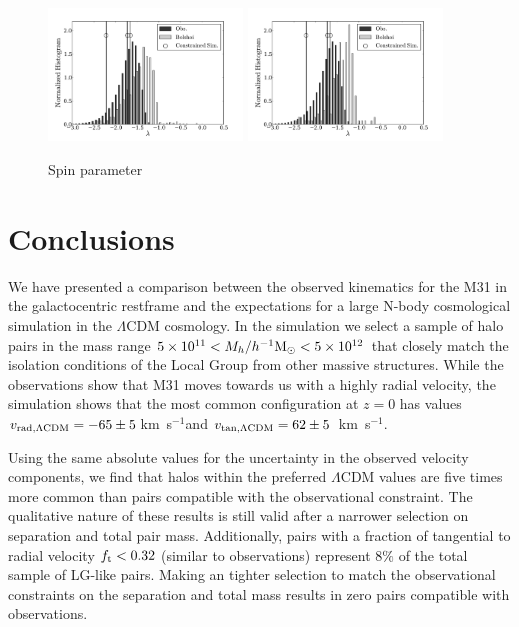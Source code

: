 \documentclass{emulateapj}
\newcommand{\kms}{\,km~s$^{-1}$}
\newcommand{\hMsun}{{\ifmmode{h^{-1}{\rm {M_{\odot}}}}\else{$h^{-1}{\rm{M_{\odot}}}$}\fi}}
\begin{document}
\begin{figure}
\begin{center}
\includegraphics[keepaspectratio=true,width=0.46\textwidth]{./figures/test_lambda.pdf}
\includegraphics[keepaspectratio=true,width=0.46\textwidth]{./figures/test_lambda_narrow.pdf}
\caption{Spin parameter}
\label{fig:lambda}
\end{center}
\end{figure}


\section{Conclusions}
We have presented a comparison between the observed kinematics for the M31 in the galactocentric restframe and the expectations for a large N-body cosmological simulation in the $\Lambda$CDM cosmology. In the simulation we select a sample of halo pairs in the mass range $5\times 10^{11}<M_{h}/\hMsun<5\times 10^{12}$ that closely match the isolation conditions of the Local Group from other massive structures. While the observations show that M31 moves towards us with a highly radial velocity, the simulation shows that the most common configuration at $z=0$ has values $v_{\rm rad, \Lambda CDM}=-65\pm5$\kms and $v_{\rm tan, \Lambda CDM}=62\pm5$ \kms. 


Using the same absolute values for the uncertainty in the observed velocity components, we find that halos within the preferred $\Lambda$CDM values are five times more common than pairs compatible with the observational constraint.  The qualitative nature of these results is still valid after a narrower selection on separation and total pair mass. Additionally, pairs with a fraction of tangential to radial velocity $f_{\rm t}<0.32$ (similar to observations) represent $8\%$ of the total sample of LG-like pairs. Making an tighter selection to match the observational constraints on the separation and total mass results in zero pairs compatible with observations.
\end{document}
